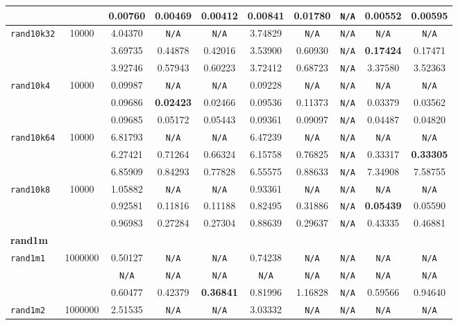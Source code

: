 {\begin{tabular}{ l | c c c c c c c c c }
\verb| | &  & 0.00760 & 0.00469 & \textbf{0.00412} & 0.00841 & 0.01780 & \verb|N/A| & 0.00552 & 0.00595 \\
\hline
\verb|rand10k32| & 10000 & 4.04370 & \verb|N/A| & \verb|N/A| & 3.74829 & \verb|N/A| & \verb|N/A| & \verb|N/A| & \verb|N/A| \\
\verb| | &  & 3.69735 & 0.44878 & 0.42016 & 3.53900 & 0.60930 & \verb|N/A| & \textbf{0.17424} & 0.17471 \\
\verb| | &  & 3.92746 & 0.57943 & 0.60223 & 3.72412 & 0.68723 & \verb|N/A| & 3.37580 & 3.52363 \\
\hline
\verb|rand10k4| & 10000 & 0.09987 & \verb|N/A| & \verb|N/A| & 0.09228 & \verb|N/A| & \verb|N/A| & \verb|N/A| & \verb|N/A| \\
\verb| | &  & 0.09686 & \textbf{0.02423} & 0.02466 & 0.09536 & 0.11373 & \verb|N/A| & 0.03379 & 0.03562 \\
\verb| | &  & 0.09685 & 0.05172 & 0.05443 & 0.09361 & 0.09097 & \verb|N/A| & 0.04487 & 0.04820 \\
\hline
\verb|rand10k64| & 10000 & 6.81793 & \verb|N/A| & \verb|N/A| & 6.47239 & \verb|N/A| & \verb|N/A| & \verb|N/A| & \verb|N/A| \\
\verb| | &  & 6.27421 & 0.71264 & 0.66324 & 6.15758 & 0.76825 & \verb|N/A| & 0.33317 & \textbf{0.33305} \\
\verb| | &  & 6.85909 & 0.84293 & 0.77828 & 6.55575 & 0.88633 & \verb|N/A| & 7.34908 & 7.58755 \\
\hline
\verb|rand10k8| & 10000 & 1.05882 & \verb|N/A| & \verb|N/A| & 0.93361 & \verb|N/A| & \verb|N/A| & \verb|N/A| & \verb|N/A| \\
\verb| | &  & 0.92581 & 0.11816 & 0.11188 & 0.82495 & 0.31886 & \verb|N/A| & \textbf{0.05439} & 0.05590 \\
\verb| | &  & 0.96983 & 0.27284 & 0.27304 & 0.88639 & 0.29637 & \verb|N/A| & 0.43335 & 0.46881 \\
\hline
\multicolumn{10}{l}{\textbf{rand1m}} \\
\hline
\verb|rand1m1| & 1000000 & 0.50127 & \verb|N/A| & \verb|N/A| & 0.74238 & \verb|N/A| & \verb|N/A| & \verb|N/A| & \verb|N/A| \\
\verb| | &  & \verb|N/A| & \verb|N/A| & \verb|N/A| & \verb|N/A| & \verb|N/A| & \verb|N/A| & \verb|N/A| & \verb|N/A| \\
\verb| | &  & 0.60477 & 0.42379 & \textbf{0.36841} & 0.81996 & 1.16828 & \verb|N/A| & 0.59566 & 0.94640 \\
\hline
\verb|rand1m2| & 1000000 & 2.51535 & \verb|N/A| & \verb|N/A| & 3.03332 & \verb|N/A| & \verb|N/A| & \verb|N/A| & \verb|N/A| \\

\end{tabular}}
